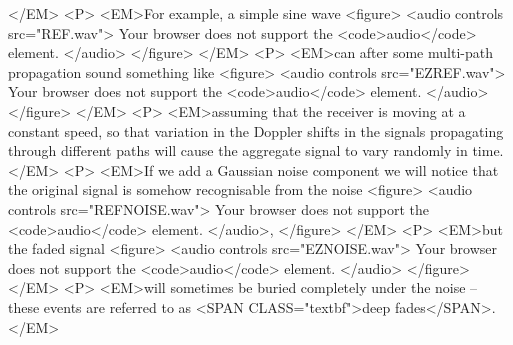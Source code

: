 </EM>
<P>
  <EM>For example, a simple sine wave
    <figure>
      <audio
        controls
        src="REF.wav">
        Your browser does not support the
        <code>audio</code> element.
      </audio>
    </figure>
</EM>
<P>
  <EM>can after some multi-path propagation sound something like
    <figure>
      <audio
        controls
        src="EZREF.wav">
        Your browser does not support the
        <code>audio</code> element.
      </audio>
    </figure>
  </EM>
<P>
  <EM>assuming that the receiver is moving at a constant speed, so that variation in the Doppler shifts in the signals propagating through different paths will cause the aggregate signal to vary randomly in time.
  </EM>
<P>
  <EM>If we add a Gaussian noise component we will notice that the original signal is somehow recognisable from the noise
    <figure>
      <audio
        controls
        src="REFNOISE.wav">
        Your browser does not support the
        <code>audio</code> element.
      </audio>,
    </figure>        
</EM>
<P>
  <EM>but the faded signal
    <figure>
      <audio
        controls
        src="EZNOISE.wav">
        Your browser does not support the
        <code>audio</code> element.
      </audio>
    </figure>        
</EM>
<P>
<EM>will sometimes be buried completely under the noise – these events are referred to as <SPAN  CLASS="textbf">deep fades</SPAN>.
</EM>
